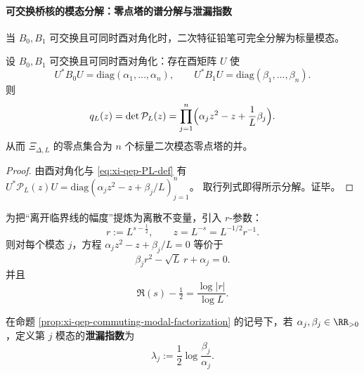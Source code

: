 \paragraph{可交换桥核的模态分解：零点塔的谱分解与泄漏指数}
当 \(B_0,B_1\) 可交换且可同时酉对角化时，二次特征铅笔可完全分解为标量模态。

\begin{proposition}[可交换桥核的模态分解]\label{prop:xi-qep-commuting-modal-factorization}
设 \(B_0,B_1\) 可交换且可同时酉对角化：存在酉矩阵 \(U\) 使
\[
U^\ast B_0U=\mathrm{diag}(\alpha_1,\dots,\alpha_n),
\qquad
U^\ast B_1U=\mathrm{diag}(\beta_1,\dots,\beta_n).
\]
则
\[
q_L(z)=\det \mathcal{P}_L(z)=\prod_{j=1}^n\Bigl(\alpha_j z^2-z+\frac1L\beta_j\Bigr).
\]
从而 \(\Xi_{\Delta,L}\) 的零点集合为 \(n\) 个标量二次模态零点塔的并。
\end{proposition}

\begin{proof}
由酉对角化与 \eqref{eq:xi-qep-PL-def} 有
\(
U^\ast \mathcal{P}_L(z)U=\mathrm{diag}(\alpha_j z^2-z+\beta_j/L)_{j=1}^n
\)。
取行列式即得所示分解。证毕。
\end{proof}

为把“离开临界线的幅度”提炼为离散不变量，引入 \(r\)-参数：
\begin{equation}\label{eq:xi-qep-r-def}
r:=L^{s-\tfrac12},
\qquad
z=L^{-s}=L^{-1/2}r^{-1}.
\end{equation}
则对每个模态 \(j\)，方程 \(\alpha_j z^2-z+\beta_j/L=0\) 等价于
\begin{equation}\label{eq:xi-qep-mode-r-quadratic}
\beta_j r^2-\sqrt L\,r+\alpha_j=0.
\end{equation}
并且
\begin{equation}\label{eq:xi-qep-re-shift-by-r}
\Re(s)-\tfrac12=\frac{\log|r|}{\log L}.
\end{equation}

\begin{definition}[模态泄漏指数]\label{def:xi-modal-leakage-index}
在命题 \ref{prop:xi-qep-commuting-modal-factorization} 的记号下，若 \(\alpha_j,\beta_j\in\RR_{>0}\)，定义第 \(j\) 模态的\textbf{泄漏指数}为
\[
\lambda_j:=\frac12\log\frac{\beta_j}{\alpha_j}.
\]
\end{definition}

